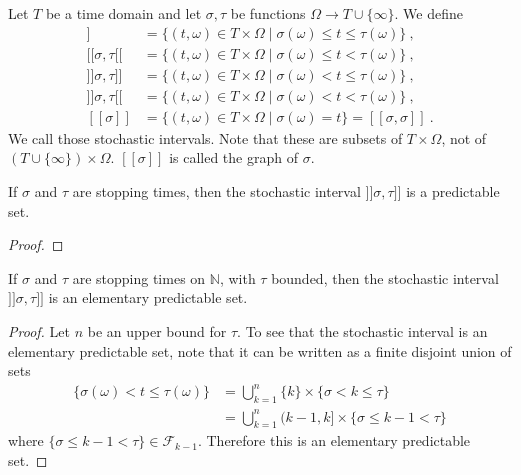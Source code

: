 \begin{definition}\label{def:stochasticInterval}
  \leanok
Let $T$ be a time domain and let $\sigma, \tau$ be functions $\Omega \to T \cup \{\infty\}$.
We define
\begin{align*}
  [\![\sigma, \tau]\!]
  &= \{(t, \omega) \in T \times \Omega \mid \sigma(\omega) \le t \le \tau(\omega)\}
  \:, \\
  [\![\sigma, \tau[\![
  &= \{(t, \omega) \in T \times \Omega \mid \sigma(\omega) \le t < \tau(\omega)\}
  \:, \\
  ]\!]\sigma, \tau]\!]
  &= \{(t, \omega) \in T \times \Omega \mid \sigma(\omega) < t \le \tau(\omega)\}
  \:, \\
  ]\!]\sigma, \tau[\![
  &= \{(t, \omega) \in T \times \Omega \mid \sigma(\omega) < t < \tau(\omega)\}
  \:, \\
  [\![\sigma]\!]
  &= \{(t, \omega) \in T \times \Omega \mid \sigma(\omega) = t\} = [\![\sigma, \sigma]\!]
  \:.
\end{align*}
We call those stochastic intervals. Note that these are subsets of $T \times \Omega$, not of $ (T \cup \{\infty\}) \times \Omega$.
$[\![\sigma]\!]$ is called the graph of $\sigma$.
\end{definition}


\begin{lemma}\label{lem:predictable_stochasticInterval}
If $\sigma$ and $\tau$ are stopping times, then the stochastic interval $]\!]\sigma, \tau]\!]$ is a predictable set.
\end{lemma}

\begin{proof}

\end{proof}


\begin{lemma}\label{lem:elementaryPredictableSet_stochasticInterval}
  \leanok
If $\sigma$ and $\tau$ are stopping times on $\mathbb{N}$, with $\tau$ bounded, then the stochastic interval $]\!]\sigma, \tau]\!]$ is an elementary predictable set.
\end{lemma}

\begin{proof}\leanok
Let $n$ be an upper bound for $\tau$.
To see that the stochastic interval is an elementary predictable set, note that it can be written as a finite disjoint union of sets
\begin{align*}
  \{\sigma(\omega) < t \le \tau(\omega)\}
  &= \bigcup_{k=1}^{n} \{k\} \times \{\sigma < k \le \tau\}
  \\ &= \bigcup_{k=1}^{n} (k-1, k] \times \{\sigma \le k-1 < \tau\}
\end{align*}
where $\{\sigma \le k-1 < \tau\} \in \mathcal{F}_{k-1}$.
Therefore this is an elementary predictable set.
\end{proof}


